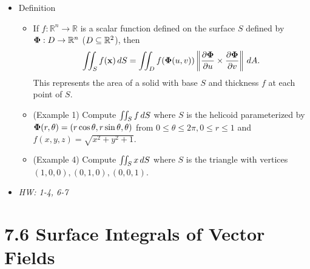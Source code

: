 \documentclass[11pt]{article}
\begin{document}
\begin{itemize}
  \item Definition
    \begin{itemize}
      \item If \(f:\mathbb R^n\to\mathbb R\) is a scalar function defined
            on the surface \(S\) defined by \(\mathbf{\Phi}:D\to\mathbb R^n\)
            (\(D\subseteq\mathbb R^2\)), then
            \[
              \iint_S f(\mathbf{x})\,d S
                =
              \iint_D
                f(\mathbf{\Phi}(u,v))
                \left\|\frac{\partial\mathbf{\Phi}}{\partial u}\times\frac{\partial\mathbf{\Phi}}{\partial v}\right\|
              \,d A
            .\]
            This represents the area of a solid with base \(S\) and
            thickness \(f\) at each point of \(S\).
      \item (Example 1) Compute \(\iint_S f\,d S\) where \(S\) is
            the helicoid parameterized by
            \(\mathbf{\Phi}(r,\theta)=\left(r\cos\theta,r\sin\theta,\theta\right)\)
            from \(0\leq\theta\leq2\pi,0\leq r\leq 1\) and
            \(f(x,y,z)=\sqrt{x^2+y^2+1}\).
      \item (Example 4) Compute \(\iint_S x\,d S\) where \(S\) is the
            triangle with vertices \((1,0,0),(0,1,0),(0,0,1)\).
    \end{itemize}
  \item\textit{
    HW: 1-4, 6-7
  }
\end{itemize}

\section*{7.6 Surface Integrals of Vector Fields}
\end{document}
